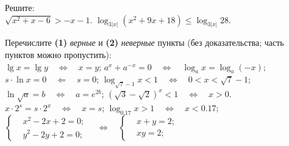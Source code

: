 %
%



\begin{problems}

\item
Решите:
\\[0.5ex]
\sbp $\sqrt{x^2 + x - 6} > - x - 1$.
\qquad
\sbp
\(
    \log_{3 |x|} (x^2 + 9 x + 18)
\leq
    \log_{3 |x|} 28
\).

\item
Перечислите \textbf{(1)} \emph{верные} и \textbf{(2)} \emph{неверные} пункты
(без доказательства; часть пунктов можно пропустить):
\\ %
\sbp $\lg x = \lg y \quad\Leftrightarrow\quad x = y$;
\qquad %
\sbp $a^x + a^{-x} = 0 \quad\Leftrightarrow\quad \log_a x = \log_a (-x)$;
\\[0.5ex] %
\sbp $s \cdot \ln x = 0 \quad\Leftarrow\quad s = 0$;
\qquad %
\sbp $\log_{\sqrt{7} - 1} x < 1 \quad\Leftrightarrow\quad 0 < x < \sqrt{7} - 1$;
\\[0.5ex] %
\sbp $\ln \sqrt{a} = b \quad\Leftrightarrow\quad a = e^{2 b}$;
\qquad %
\sbp $(\sqrt{3} - \sqrt{2})^x < 1 \quad\Leftrightarrow\quad x > 0$.
\\[0.5ex] %
\sbp $x \cdot 2^{s} = s \cdot 2^{x} \quad\Leftrightarrow\quad x = s$;
\qquad %
\sbp $\log_{0.17} x > 1 \quad\Leftrightarrow\quad x < 0.17$;
\\[0.5ex] %
\sbp
\(
    \left\{\begin{aligned}
        & x^2 - 2 x + 2 = 0 ; \\
        & y^2 - 2 y + 2 = 0 ;
    \end{aligned}\right.
\quad\Leftrightarrow\quad
    \left\{\begin{aligned}
        & x + y = 2 ; \\
        & x y = 2 ;
    \end{aligned}\right.
\)

\end{problems}


